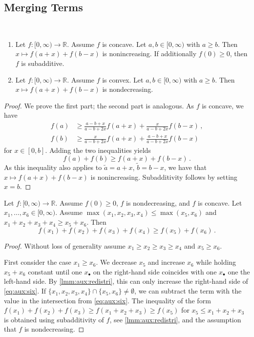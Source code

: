 \documentclass{article}
\newcommand{\R}{\mathbb{R}}
\newcommand{\Rp}{[0, \infty)} %
\newcommand{\equationFullstop}{\, .}
\newcommand{\eqfs}{\equationFullstop}
\newcommand{\equationComma}{\, ,}
\newcommand{\eqcm}{\equationComma}
\begin{document}
\begin{appendix}
\subsection{Merging Terms}
%
%
\begin{lemma}\label{lmm:aux:redistri}\mbox{ }
	\begin{enumerate}[label=(\roman*)]
		\item Let $f\colon\Rp \to \R$. Assume $f$ is concave. Let $a,b\in\Rp$ with $a\geq b$. Then
		$x \mapsto f(a+x) + f(b-x)$ is nonincreasing. If additionally $f(0)\geq 0$, then $f$ is subadditive.
		\item 
		Let $f\colon\Rp \to \R$. Assume $f$ is convex. Let $a,b\in\Rp$ with $a\geq b$. Then
		$x \mapsto f(a+x) + f(b-x)$ is nondecreasing.
	\end{enumerate}
\end{lemma}
%
\begin{proof}
	We prove the first part; the second part is analogous.
	As $f$ is concave, we have
	\begin{align*}
		f(a) &\geq \frac{a-b+x}{a-b+2x} f(a+x) + \frac{x}{a-b+2x} f(b-x)\eqcm\\
		f(b) &\geq \frac{x}{a-b+2x} f(a+x) + \frac{a-b+x}{a-b+2x} f(b-x)
	\end{align*}
	for $x\in[0, b]$. Adding the two inequalities yields
	\begin{equation}
		f(a) + f(b) \geq f(a+x)  + f(b-x)
		\eqfs
	\end{equation}
	As this inequality also applies to $\tilde a = a+x$, $\tilde b = b-x$, we have that $x \mapsto f(a+x) + f(b-x)$ is nonincreasing. 
	Subadditivity follows by setting $x = b$.
\end{proof}
%
\begin{lemma}\label{lmm:aux:six}
	Let $f\colon\Rp \to \R$. Assume $f(0)\geq 0$, $f$ is nondecreasing, and $f$ is concave. Let $x_1, \dots, x_6 \in \Rp$.
	Assume $\max(x_1, x_2, x_3, x_4) \leq \max(x_5, x_6)$ and $x_1+x_2+x_3+x_4 \geq x_5+x_6$. Then
	\begin{equation}\label{eq:aux:six}
		f(x_1) + f(x_2) + f(x_3) + f(x_4) \geq f(x_5) + f(x_6)
		\eqfs
	\end{equation}
\end{lemma}
%
\begin{proof}
	Without loss of generality assume $x_1 \geq x_2 \geq x_3 \geq x_4$ and $x_5\geq x_6$.
	
	First consider the case $x_1 \geq x_6$. We decrease $x_5$ and increase $x_6$ while holding $x_5+x_6$ constant until one $x_\bullet$ on the right-hand side coincides with one $x_\bullet$ one the left-hand side. By \cref{lmm:aux:redistri}, this can only increase the right-hand side of \eqref{eq:aux:six}.
	If $\{x_1, x_2, x_3, x_4\} \cap \{x_5, x_6\} \neq \emptyset$, we can subtract the term with the value in the intersection from \eqref{eq:aux:six}.
	The inequality of the form $f(x_1) + f(x_2) + f(x_3) \geq f(x_1 +x_2+x_3) \geq f(x_5)$ for $x_5 \leq x_1+x_2+x_3$ is obtained using subadditivity of $f$, see \cref{lmm:aux:redistri}, and the assumption that $f$ is nondecreasing.
	

\end{proof}
\end{appendix}
\end{document}
